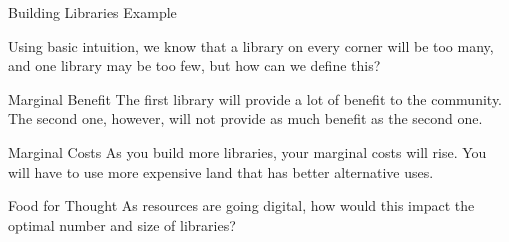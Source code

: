 \documentclass{beamer}
\begin{document}
\begin{frame}{Building Libraries Example}

Using basic intuition, we know that a library on every corner will be too many, and one library may be too few, but how can we define this?

\begin{exampleblock}{Marginal Benefit}
The first library will provide a lot of benefit to the community. The second one, however, will not provide as much benefit as the second one.
\end{exampleblock}

\begin{exampleblock}{Marginal Costs}
As you build more libraries, your marginal costs will rise. You will have to use more expensive land that has better alternative uses.
\end{exampleblock}

\begin{alertblock}{Food for Thought}
As resources are going digital, how would this impact the optimal number and size of libraries?
\end{alertblock}

\end{frame}

\end{document}
